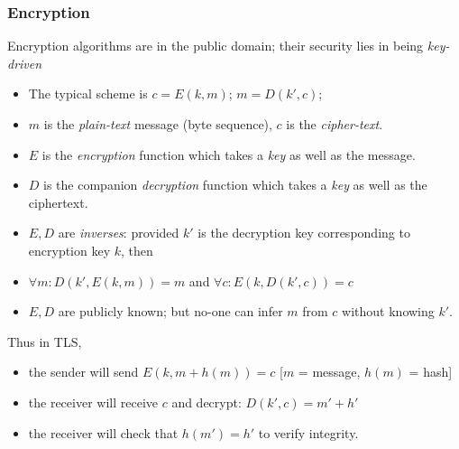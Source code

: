 \documentclass[10pt, hyperref={pdfpagelabels=false}]{beamer}
\begin{document}
\begin{frame}
\frametitle{Encryption}
Encryption algorithms are in the public domain; their security lies in being \emph{key-driven}
\begin{itemize}
\item The typical scheme is {\color{blue}$c = E(k,m)$; $m = D(k',c)$;} 
\item $m$ is the \emph{\color{blue}plain-text} message (byte sequence), $c$ is the \emph{\color{blue}cipher-text}.
\item $E$ is the \emph{\color{blue}encryption} function which takes a \emph{\color{blue}key} as well as the message. 
\item $D$ is the companion \emph{\color{blue}decryption} function which takes a \emph{\color{blue}key} as well as the ciphertext.
\item $E, D$ are \emph{\color{blue}inverses}: provided $k'$ is the decryption key corresponding to encryption key $k$, then
\item {\color{brown}$\forall m: D(k', E(k,m)) = m$} and {\color{brown}$\forall c: E(k, D(k',c)) = c$}
\item $E, D$ are publicly known; but no-one can infer $m$ from $c$ without knowing $k'$.
\end{itemize} 
Thus in TLS, 
\begin{itemize}
\item the sender will send $E(k,m+h(m)) = c$ [$m$ = message, $h(m)$ = hash] 
\item the receiver will receive $c$ and decrypt: $D(k',c) = m'+h'$
\item the receiver will check that $h(m') = h'$ to verify integrity. 
\end{itemize} 
\end{frame}
\end{document}
